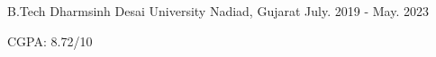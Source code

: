

\begin{cventries}

  \cventry
    {B.Tech} %
    {Dharmsinh Desai University} %
    {Nadiad, Gujarat} %
    {July. 2019 - May. 2023} %
    {
      \begin{cvitems} %
        {CGPA: 8.72/10}
      \end{cvitems}
    }

\end{cventries}
